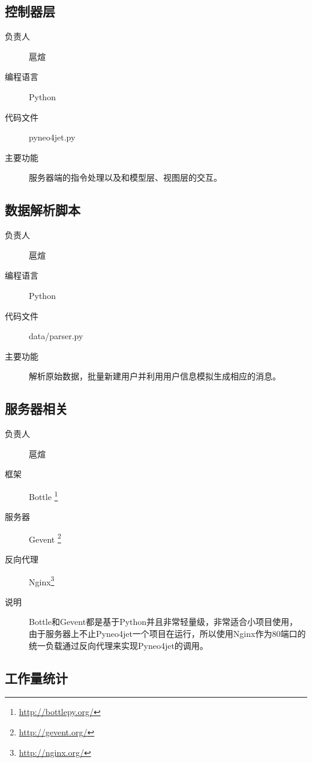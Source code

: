 \documentclass{yaldc}
\begin{document}
\subsection{控制器层}

\begin{description}
    \item[负责人] 扈煊
    \item[编程语言] Python
    \item[代码文件] pyneo4jet.py
    \item[主要功能] 服务器端的指令处理以及和模型层、视图层的交互。
\end{description}

\subsection{数据解析脚本}

\begin{description}
    \item[负责人] 扈煊
    \item[编程语言] Python
    \item[代码文件] data/parser.py
    \item[主要功能] 解析原始数据，批量新建用户并利用用户信息模拟生成相应的消息。
\end{description}

\subsection{服务器相关}

\begin{description}
    \item[负责人] 扈煊
    \item[框架] Bottle \footnote{\url{http://bottlepy.org/}}
    \item[服务器] Gevent \footnote{\url{http://gevent.org/}}
    \item[反向代理] Nginx\footnote{\url{http://nginx.org/}}
    \item[说明] Bottle和Gevent都是基于Python并且非常轻量级，非常适合小项目使用，
        由于服务器上不止Pyneo4jet一个项目在运行，所以使用Nginx作为80端口的
        统一负载通过反向代理来实现Pyneo4jet的调用。
\end{description}

\subsection{工作量统计}
\end{document}
